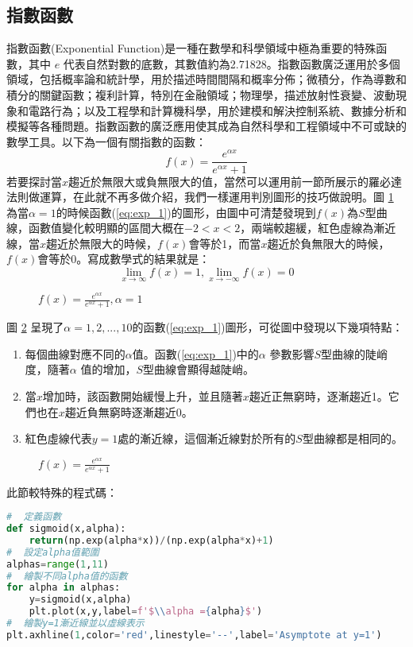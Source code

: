 \documentclass[12pt, a4paper]{article}
\begin{document}
\subsection{指數函數}
指數函數(Exponential Function)是一種在數學和科學領域中極為重要的特殊函數，其中 $e$ 代表自然對數的底數，其數值約為2.71828。指數函數廣泛運用於多個領域，包括概率論和統計學，用於描述時間間隔和概率分佈；微積分，作為導數和積分的關鍵函數；複利計算，特別在金融領域；物理學，描述放射性衰變、波動現象和電路行為；以及工程學和計算機科學，用於建模和解決控制系統、數據分析和模擬等各種問題。指數函數的廣泛應用使其成為自然科學和工程領域中不可或缺的數學工具。以下為一個有關指數的函數：
\begin{equation}\label{eq:exp_1}
f(x)=\frac{{e^{{\alpha x}}}}{{e^{{\alpha x}}+1}}
\end{equation}
若要探討當$x$趨近於無限大或負無限大的值，當然可以運用前一節所展示的羅必達法則做運算，在此就不再多做介紹，我們一樣運用判別圖形的技巧做說明。圖 \ref{fig:exp_1} 為當$\alpha =1$的時候函數(\ref{eq:exp_1})的圖形，由圖中可清楚發現到$f(x)$為$S$型曲線，函數值變化較明顯的區間大概在$-2 < x < 2$，兩端較趨緩，紅色虛線為漸近線，當$x$趨近於無限大的時候，$f(x)$會等於1，而當$x$趨近於負無限大的時候，$f(x)$會等於0。寫成數學式的結果就是：
$$\lim_{x \rightarrow \infty}f(x)=1,\lim_{x \rightarrow -\infty}f(x)=0$$
\begin{figure}[H]
    \caption{$f(x)=\frac{{e^{{\alpha x}}}}{{e^{{\alpha x}}+1}},\alpha=1$}
    \label{fig:exp_1}
\end{figure}
圖 \ref{fig:exp_2} 呈現了$\alpha =1,2,...,10$的函數(\ref{eq:exp_1})圖形，可從圖中發現以下幾項特點：
\begin{enumerate}
\item 每個曲線對應不同的$\alpha$值。函數(\ref{eq:exp_1})中的$\alpha$ 參數影響$S$型曲線的陡峭度，隨著$\alpha$ 值的增加，$S$型曲線會顯得越陡峭。
\item 當$x$增加時，該函數開始緩慢上升，並且隨著$x$趨近正無窮時，逐漸趨近1。它們也在$x$趨近負無窮時逐漸趨近0。
\item 紅色虛線代表$y=1$處的漸近線，這個漸近線對於所有的$S$型曲線都是相同的。
\end{enumerate}
\begin{figure}[H]
    \caption{$f(x)=\frac{{e^{{\alpha x}}}}{{e^{{\alpha x}}+1}}$}
    \label{fig:exp_2}
\end{figure}
此節較特殊的程式碼：
\begin{lstlisting}[language=Python]
#  定義函數
def sigmoid(x,alpha):
    return(np.exp(alpha*x))/(np.exp(alpha*x)+1)
#  設定alpha值範圍
alphas=range(1,11)
#  繪製不同alpha值的函數
for alpha in alphas:
    y=sigmoid(x,alpha)
    plt.plot(x,y,label=f'$\\alpha ={alpha}$')
#  繪製y=1漸近線並以虛線表示
plt.axhline(1,color='red',linestyle='--',label='Asymptote at y=1')
\end{lstlisting}
\end{document}
